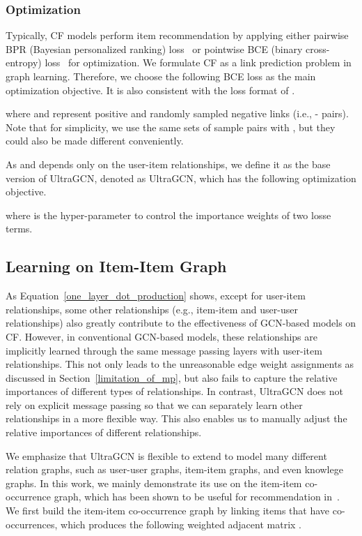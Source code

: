 \documentclass[sigconf,authorversion]{acmart}
\begin{document}
\subsubsection{Optimization}
Typically, CF models perform item recommendation by applying either pairwise BPR (Bayesian personalized ranking) loss~\cite{BPR} or pointwise BCE (binary cross-entropy) loss~\cite{NeuMF} for optimization. We formulate CF as a link prediction problem in graph learning. Therefore, we choose the following BCE loss as the main optimization objective. It is also consistent with the loss format of .

where  and  represent positive and randomly sampled negative links (i.e., - pairs). Note that for simplicity, we use the same sets of sample pairs with , but they could also be made different conveniently. 

As  and  depends only on the user-item relationships, we define it as the base version of UltraGCN, denoted as  UltraGCN, which has the following optimization objective. 

where  is the hyper-parameter to control the importance weights of two losse terms. 


\subsection{Learning on Item-Item Graph}
\label{learning_on_ii}
As Equation~\ref{one_layer_dot_production} shows, 
except for user-item relationships, some other relationships (e.g., item-item and user-user relationships) also greatly contribute to the effectiveness of GCN-based models on CF. However, in conventional GCN-based models, these relationships are implicitly learned through the same message passing layers with user-item relationships. This not only leads to the unreasonable edge weight assignments as discussed in Section~\ref{limitation_of_mp}, but also fails to capture the relative importances of different types of relationships. In contrast, UltraGCN does not rely on explicit message passing so that we can separately learn other relationships in a more flexible way. This also enables us to manually adjust the relative importances of different relationships.

We emphasize that UltraGCN is flexible to extend to model many different relation graphs, such as user-user graphs, item-item graphs, and even knowlege graphs. In this work, we mainly demonstrate its use on the item-item co-occurrence graph, which has been shown to be useful for recommendation in~\cite{M2GRL}. We first build the item-item co-occurrence graph by linking items that have co-occurrences, which produces the following weighted adjacent matrix . 
\end{document}
